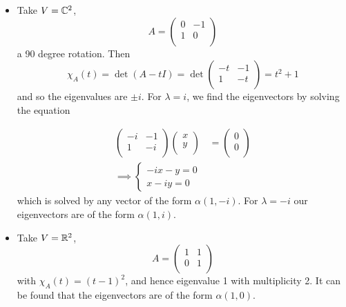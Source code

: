 \documentclass{../../template/note}
\begin{document}
    \begin{example}
        \begin{itemize}
            \item Take \(V = \mathbb C^2\),
            \[
                A = \begin{pmatrix}
                 0 & -1 \\
                 1 & 0 \\
                \end{pmatrix}
            \]
            a 90 degree rotation. Then
            \[
                \chi_A(t) = \det(A - tI) = \det\begin{pmatrix}
                 -t & -1 \\
                 1 & -t \\
                \end{pmatrix} = t^2+1
            \]
            and so the eigenvalues are \(\pm i\). For \(\lambda = i\), we find the eigenvectors by solving the equation
            
            \begin{align*}
                \begin{pmatrix}
                 -i & -1 \\
                 1 & -i \\
                \end{pmatrix} \begin{pmatrix}
                 x \\
                 y \\
                \end{pmatrix} &= \begin{pmatrix}
                 0 \\
                 0 \\
                \end{pmatrix} \\
                \implies \begin{cases}
                    -ix - y = 0 \\
                    x - iy = 0
                \end{cases}    
            \end{align*}
            which is solved by any vector of the form \(\alpha(1, -i)\). For \(\lambda = -i\) our eigenvectors are of the form \(\alpha(1, i)\).
            \item Take \(V = \mathbb R^2\),
            \[
                A = \begin{pmatrix}
                 1 & 1 \\
                 0 & 1 \\
                \end{pmatrix}
            \]
            with \(\chi_A(t) = (t-1)^2\), and hence eigenvalue 1 with multiplicity 2. It can be found that the eigenvectors are of the form \(\alpha(1, 0)\).
        \end{itemize}
    \end{example}
    
\end{document}
